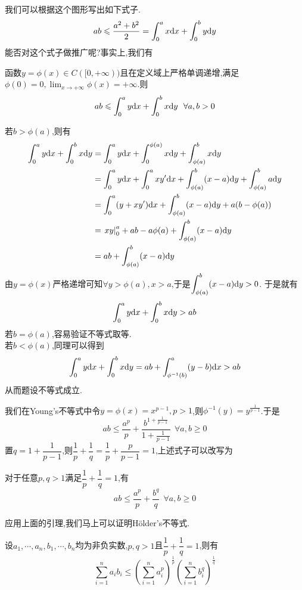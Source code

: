 \documentclass{ctexart}
\begin{document}
我们可以根据这个图形写出如下式子.
$$ab\leqslant\dfrac{a^2+b^2}{2}=\int_0^ax\mathrm{d} x+\int_0^by\mathrm{d} y$$
能否对这个式子做推广呢?事实上,我们有
\begin{formal}
    函数$y=\phi(x)\in C([0,+\infty))$且在定义域上严格单调递增,满足$\displaystyle\phi(0)=0,\lim_{x\to+\infty}\phi(x)=+\infty$.则
    $$ab\leqslant\int_0^ay\dx+\int_0^bx\di y\ \ \forall a,b>0$$
\end{formal}
\begin{solution}[Proof.]
    若$b>\phi(a)$,则有
    $$\begin{aligned}
        \int_0^ay\mathrm{d} x+\int_0^b x\mathrm{d} y
        &= \int_0^ay\mathrm{d} x+\int_0^{\phi(a)}x\mathrm{d} y+\int_{\phi(a)}^{b}x\mathrm{d} y\\
        &= \int_0^ay\mathrm{d} x+\int_0^{a}xy'\mathrm{d} x+\int_{\phi(a)}^{b}(x-a)\mathrm{d} y+\int_{\phi(a)}^{b}a\mathrm{d} y\\
        &= \int_0^a(y+xy')\mathrm{d} x+\int_{\phi(a)}^{b}(x-a)\mathrm{d} y+a(b-\phi(a))\\
        &= \left.xy\right|_0^a+ab-a\phi(a)+\int_{\phi(a)}^{b}(x-a)\mathrm{d} y \\
        &= ab+\int_{\phi(a)}^{b}(x-a)\mathrm{d} y \\
    \end{aligned}$$
    由$y=\phi(x)$严格递增可知$\forall y>\phi(a),x>a$,于是$\displaystyle\int_{\phi(a)}^b(x-a)\mathrm{d} y>0$.
    于是就有$$\int_0^ay\mathrm{d} x+\int_0^b x\mathrm{d} y>ab$$
    若$b=\phi(a)$,容易验证不等式取等.\\
    若$b<\phi(a)$,同理可以得到
    $$\int_0^ay\mathrm{d} x+\int_0^b x\mathrm{d} y=ab+\int_{\phi^{-1}(b)}^a(y-b)\mathrm{d} x>ab$$
    从而题设不等式成立.
\end{solution}\noindent
我们在Young's不等式中令$y=\phi(x)=x^{p-1},p>1$,则$\phi^{-1}(y)=y^{\frac{1}{p-1}}$.于是
$$ab\leqslant\dfrac{a^p}{p}+\dfrac{b^{1+\frac{1}{p-1}}}{1+\frac{1}{p-1}}\ \ \forall a,b\geqslant 0$$
置$q=1+\dfrac{1}{p-1}$,则$\dfrac{1}{p}+\dfrac{1}{q}=\dfrac{1}{p}+\dfrac{p}{p-1}=1$,上述式子可以改写为
\begin{theorem}
    对于任意$p,q>1$满足$\dfrac{1}{p}+\dfrac{1}{q}=1$,有
    $$ab\leqslant\dfrac{a^p}{p}+\dfrac{b^q}{q}\ \ \forall a,b\geqslant0$$
\end{theorem}\noindent
应用上面的引理,我们马上可以证明Hölder's不等式.
\begin{formal}
    设$a_1,\cdots,a_n,b_1,\cdots,b_n$均为非负实数,$p,q>1$且$\dfrac{1}{p}+\dfrac{1}{q}=1$,则有
    $$\sum_{i=1}^{n}a_ib_i\leqslant\left(\sum_{i=1}^{n}a_i^p\right)^{\frac{1}{p}}\left(\sum_{i=1}^{n}b_i^q\right)^{\frac{1}{q}}$$
\end{formal}\noindent
\end{document}
